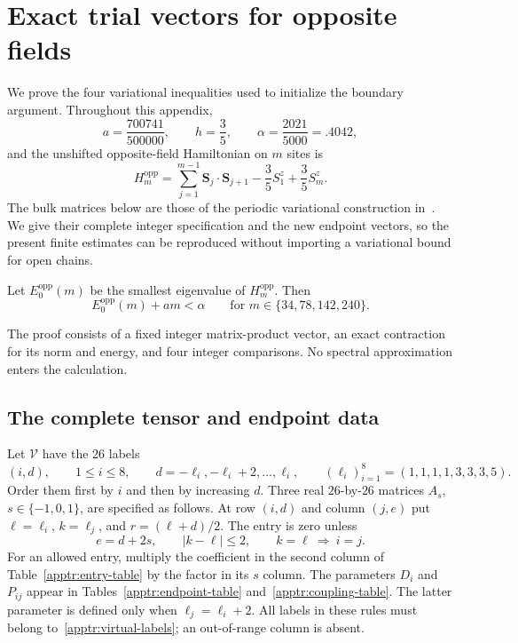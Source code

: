 \section{Exact trial vectors for opposite fields}\label{app:trials}

We prove the four variational inequalities used to initialize the
boundary argument.  Throughout this appendix,
\[
 a=\frac{700741}{500000},\qquad h=\frac35,\qquad
 \alpha=\frac{2021}{5000}=.4042,
\]
and the unshifted opposite-field Hamiltonian on $m$ sites is
\begin{equation}\label{apptr:hamiltonian}
 H_m^{\mathrm{opp}}
 =\sum_{j=1}^{m-1}\mathbf S_j\cdot\mathbf S_{j+1}
   -\frac35S_1^z+\frac35S_m^z.
\end{equation}
The bulk matrices below are those of the periodic variational
construction in~\cite[Section ``Two variational inputs'']{periodic}.
We give their complete integer specification and the new endpoint
vectors, so the present finite estimates can be reproduced without
importing a variational bound for open chains.

\begin{proposition}\label{apptr:bound}
Let $E_0^{\mathrm{opp}}(m)$ be the smallest eigenvalue of
$H_m^{\mathrm{opp}}$.  Then
\begin{equation}\label{apptr:four-bounds}
 E_0^{\mathrm{opp}}(m)+am<\alpha
 \qquad\text{for }m\in\{34,78,142,240\}.
\end{equation}
\end{proposition}

The proof consists of a fixed integer matrix-product vector, an exact
contraction for its norm and energy, and four integer comparisons.
No spectral approximation enters the calculation.

\subsection{The complete tensor and endpoint data}

Let $\mathcal V$ have the $26$ labels
\begin{equation}\label{apptr:virtual-labels}
 (i,d),\qquad 1\le i\le8,\qquad
 d=-\ell_i,-\ell_i+2,\ldots,\ell_i,
 \qquad(\ell_i)_{i=1}^8=(1,1,1,1,3,3,3,5).
\end{equation}
Order them first by $i$ and then by increasing $d$.  Three real
$26$-by-$26$ matrices $A_s$, $s\in\{-1,0,1\}$, are specified as follows.
At row $(i,d)$ and column $(j,e)$ put
$\ell=\ell_i$, $k=\ell_j$, and $r=(\ell+d)/2$.
The entry is zero unless
\begin{equation}\label{apptr:support}
 e=d+2s,\qquad |k-\ell|\le2,\qquad
 k=\ell\ \Longrightarrow\ i=j.
\end{equation}
For an allowed entry, multiply the coefficient in the second column of
Table~\ref{apptr:entry-table} by the factor in its $s$ column.
The parameters $D_i$ and $P_{ij}$ appear in
Tables~\ref{apptr:endpoint-table} and~\ref{apptr:coupling-table}.
The latter parameter is defined only when $\ell_j=\ell_i+2$.
All labels in these rules must belong to~\eqref{apptr:virtual-labels};
an out-of-range column is absent.

